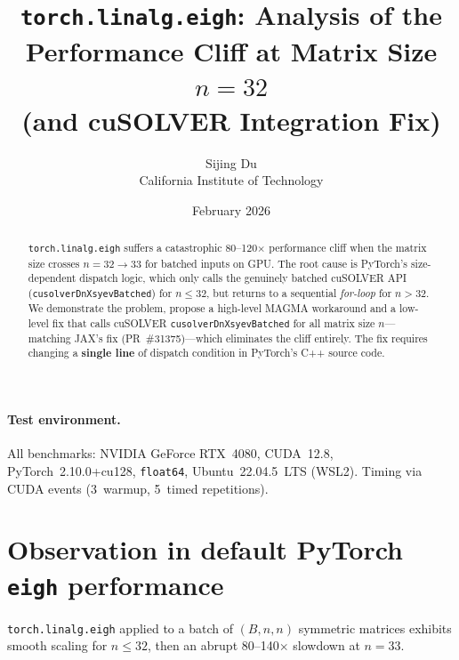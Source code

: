 \documentclass[10pt, letterpaper]{article}
\title{\vspace{-1cm} \textbf{\texttt{torch.linalg.eigh}: Analysis of the Performance Cliff at Matrix Size $n=32$} \\ 
      \large (and cuSOLVER Integration Fix)}
\author{Sijing Du \\ \small California Institute of Technology}
\date{February 2026}
\begin{document}
\maketitle

\begin{abstract}
\texttt{torch.linalg.eigh} suffers a catastrophic 80--120$\times$ performance
cliff when the matrix size crosses $n = 32 \to 33$ for batched inputs
on GPU. The root cause is PyTorch's size-dependent dispatch logic, which only calls
the genuinely batched cuSOLVER API (\texttt{cusolverDnXsyevBatched}) for
$n \le 32$, but returns to a sequential \textit{for-loop} for $n>32$. We demonstrate the problem, propose a high-level MAGMA workaround and a low-level fix that calls cuSOLVER \texttt{cusolverDnXsyevBatched} for all matrix size $n$---matching
JAX's fix (PR~\#31375)---which eliminates the cliff entirely. The fix requires changing a \textbf{single line} of
dispatch condition in PyTorch's C++ source code.
\end{abstract}

\paragraph{Test environment.}
All benchmarks: NVIDIA GeForce RTX~4080, CUDA~12.8,
PyTorch~2.10.0+cu128, \texttt{float64}, Ubuntu~22.04.5~LTS (WSL2).
Timing via CUDA events (3~warmup, 5~timed repetitions).


\section{Observation in default PyTorch \texttt{eigh} performance}
\label{sec:observation}

\texttt{torch.linalg.eigh} applied to a batch of $(B, n, n)$ symmetric
matrices exhibits smooth scaling for $n \le 32$, then an abrupt
80--140$\times$ slowdown at $n = 33$.
\end{document}
